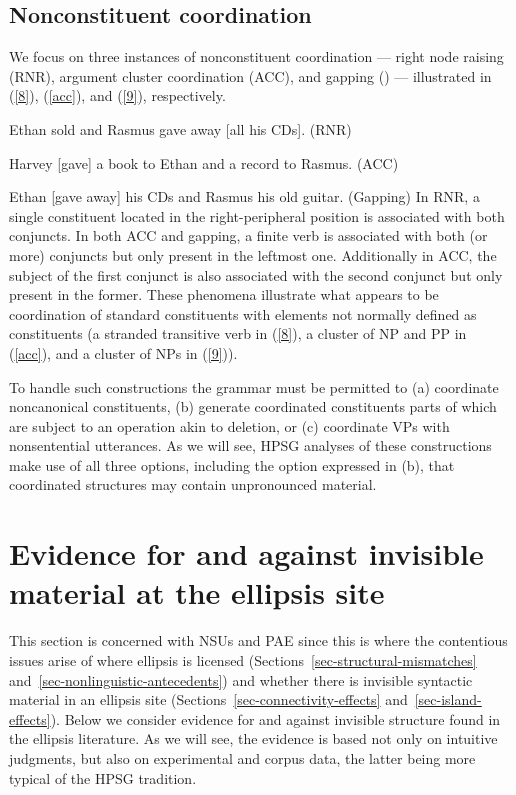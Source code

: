 {\subsection{Nonconstituent coordination}

We focus on three instances of nonconstituent coordination --- right node raising (RNR), argument
cluster coordination (ACC), and gapping (\citealt{Ross1967}) --- illustrated in (\ref{8}), (\ref{acc}), and (\ref{9}), respectively.

 \ea Ethan sold and Rasmus gave away [all his CDs]. (RNR) \label{8}\z

\ea Harvey [gave] a book to Ethan and a record to Rasmus. (ACC) \label{acc}\z

 \ea Ethan [gave away] his CDs and Rasmus his old guitar. (Gapping)\label{9}\z
In RNR, a single constituent located in the right-peripheral position is associated with both conjuncts. In both ACC and gapping, a finite verb is associated with both (or more) conjuncts but only present in the leftmost one. Additionally in ACC, the subject of the first conjunct is also associated with the second conjunct but only present in the former. These phenomena illustrate what appears to be coordination of standard constituents with elements not normally defined as constituents (a stranded transitive verb in (\ref{8}), a cluster of NP and PP in (\ref{acc}), and a cluster of NPs in (\ref{9})).
%

 To handle such constructions the grammar must be permitted to (a) coordinate noncanonical constituents, (b) generate coordinated constituents parts of which are subject to an operation akin to deletion, or (c) coordinate VPs with nonsentential utterances. As we will see, HPSG analyses of these constructions make use of all three options, including the option expressed in (b), that coordinated structures may contain unpronounced material.

\section{Evidence for and against invisible material at the ellipsis site}
\label{sec-evidence-for-invisible-material}

This section is concerned with NSUs and PAE since this is where the contentious issues arise of where ellipsis is licensed (Sections~\ref{sec-structural-mismatches} and~\ref{sec-nonlinguistic-antecedents}) and whether there is invisible syntactic material in an ellipsis site (Sections~\ref{sec-connectivity-effects} and~\ref{sec-island-effects}). Below we consider evidence for and against invisible structure found in the ellipsis literature. As we will see, the evidence is based not only on intuitive judgments, but also on experimental and corpus data, the latter being more typical of the HPSG tradition.


}
